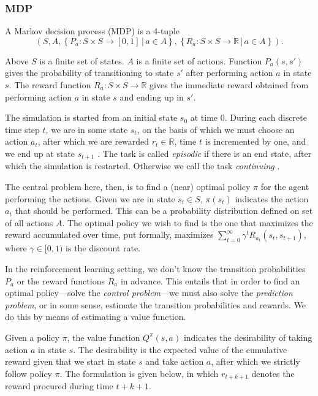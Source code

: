 \documentclass{article} %
\newcommand{\setof}[1]{\ensuremath{\left \{ #1 \right \}}}
\begin{document}
\subsubsection{MDP}

A Markov decision process (MDP) \cite{book} is a 4-tuple
\begin{equation}
  (S, A, \setof{P_a : S \times S \rightarrow [0,1] \,|\, a \in A},
  \setof{R_a : S \times S \rightarrow \mathbb{R} \,|\, a \in A}).
\end{equation}

Above $S$ is a finite set of states. $A$ is a finite set of actions. Function
$P_a(s, s')$ gives the probability of transitioning to state $s'$ after
performing action $a$ in state $s$. The reward function $R_a : S \times S
\rightarrow \mathbb{R}$ gives the immediate reward obtained from performing
action $a$ in state $s$ and ending up in $s'$.

The simulation is started from an initial state $s_0$ at time 0. During each
discrete time step $t$, we are in some state $s_t$, on the basis of which we
must choose an action $a_t$, after which we are rewarded $r_t \in \mathbb{R}$,
time $t$ is incremented by one, and we end up at state $s_{t+1}$
\cite{abe2002empirical}. The task is called \emph{episodic} if there is an end
state, after which the simulation is restarted. Otherwise we call the task
\emph{continuing} \cite{book}.

The central problem here, then, is to find a (near) optimal policy $\pi$ for
the agent performing the actions. Given we are in state $s_t \in S$, $\pi(s_t)$
indicates the action $a_t$ that should be performed. This can be a probability
distribution defined on set of all actions $A$. The optimal policy we wish to
find is the one that maximizes the reward accumulated over time, put formally,
maximizes $\sum_{t=0}^\infty \gamma^t R_{a_t}(s_t, s_{t+1})$, where $\gamma \in
[0,1)$ is the discount rate.

In the reinforcement learning setting, we don't know the transition
probabilities $P_a$ or the reward functions $R_a$ in advance. This entails that
in order to find an optimal policy---solve the \emph{control problem}---we
must also solve the \emph{prediction problem}, or in some sense, estimate the
transition probabilities and rewards. We do this by means of estimating a value
function.

Given a policy $\pi$, the value function $Q^\pi(s,a)$ indicates the
desirability of taking action $a$ in state $s$. The desirability is the
expected value of the cumulative reward given that we start in state $s$ and
take action $a$, after which we strictly follow policy $\pi$. The formulation
is given below, in which $r_{t+k+1}$ denotes the reward procured during time
$t+k+1$.
\end{document}
